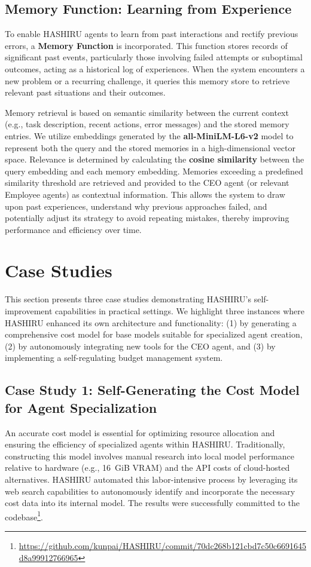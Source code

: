 \documentclass[conference]{IEEEtran}
\begin{document}
\subsection{Memory Function: Learning from Experience}
\label{subsec:memory}

To enable HASHIRU agents to learn from past interactions and rectify previous errors, a \textbf{Memory Function} is incorporated. This function stores records of significant past events, particularly those involving failed attempts or suboptimal outcomes, acting as a historical log of experiences. When the system encounters a new problem or a recurring challenge, it queries this memory store to retrieve relevant past situations and their outcomes.

Memory retrieval is based on semantic similarity between the current context (e.g., task description, recent actions, error messages) and the stored memory entries. We utilize embeddings generated by the \textbf{all-MiniLM-L6-v2} model \cite{wang2020minilmdeepselfattentiondistillation} to represent both the query and the stored memories in a high-dimensional vector space. Relevance is determined by calculating the \textbf{cosine similarity} between the query embedding and each memory embedding. Memories exceeding a predefined similarity threshold are retrieved and provided to the CEO agent (or relevant Employee agents) as contextual information. This allows the system to draw upon past experiences, understand why previous approaches failed, and potentially adjust its strategy to avoid repeating mistakes, thereby improving performance and efficiency over time.

\section{Case Studies}
\label{sec:casestudies}
This section presents three case studies demonstrating HASHIRU's self-improvement capabilities in practical settings. We highlight three instances where HASHIRU enhanced its own architecture and functionality: (1) by generating a comprehensive cost model for base models suitable for specialized agent creation, (2) by autonomously integrating new tools for the CEO agent, and (3) by implementing a self-regulating budget management system.

\subsection{Case Study 1: Self-Generating the Cost Model for Agent Specialization}
\label{sec:casestudy1_costmodel}
An accurate cost model is essential for optimizing resource allocation and ensuring the efficiency of specialized agents within HASHIRU. Traditionally, constructing this model involves manual research into local model performance relative to hardware (e.g., 16~GiB VRAM) and the API costs of cloud-hosted alternatives. HASHIRU automated this labor-intensive process by leveraging its web search capabilities to autonomously identify and incorporate the necessary cost data into its internal model. The results were successfully committed to the codebase\footnote{\url{https://github.com/kunpai/HASHIRU/commit/70dc268b121cbd7c50c6691645d8a99912766965}}.
\end{document}
